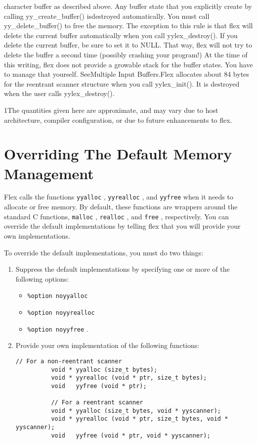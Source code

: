 \documentclass[openany,oneside]{book}
\begin{document}
character buffer as described above. Any buffer state that you explicitly
create by calling yy\_{}create\_{}buffer() isdestroyed automatically. You
must call yy\_{}delete\_{}buffer() to free the memory. The exception to this rule is
that flex will delete the current buffer automatically when you call
yylex\_{}destroy(). If you delete the current buffer, be sure to set it to NULL. 
That way, flex will not try to delete the buffer a second time (possibly
crashing your program!) At the time of this writing, flex does not provide a
growable stack for the buffer states.  You have to manage that yourself. 
SeeMultiple Input Buffers.Flex allocates about 84 bytes for the reentrant scanner structure when
you call yylex\_{}init(). It is destroyed when the user calls yylex\_{}destroy().

1The
quantities given here are approximate, and may vary due to host architecture,
compiler configuration, or due to future enhancements to flex.
\section{Overriding The Default Memory Management}


Flex calls the functions \verb`yyalloc` , \verb`yyrealloc` , and \verb`yyfree` when it needs to allocate or free memory. By default, these functions are
wrappers around the standard C functions, \verb`malloc` , \verb`realloc` , and \verb`free` , respectively. You can override the default implementations by telling
flex that you will provide your own implementations.

To override the default implementations, you must do two things:
\begin{enumerate}
\item Suppress the default implementations by specifying one or more of the
following options:
\begin{itemize}
\item  \verb`%option noyyalloc` 
\item  \verb`%option noyyrealloc` 
\item  \verb`%option noyyfree` .
\end{itemize}

\item Provide your own implementation of the following functions:
\begin{verbatim}
// For a non-reentrant scanner
          void * yyalloc (size_t bytes);
          void * yyrealloc (void * ptr, size_t bytes);
          void   yyfree (void * ptr);
          
          // For a reentrant scanner
          void * yyalloc (size_t bytes, void * yyscanner);
          void * yyrealloc (void * ptr, size_t bytes, void * yyscanner);
          void   yyfree (void * ptr, void * yyscanner);
\end{verbatim}

\end{enumerate}
\end{document}
